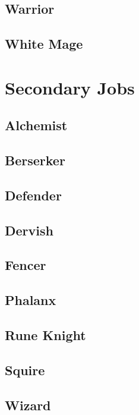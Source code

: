 \subsection{Warrior}\label{subsec:pjob-warrior}


\subsection{White Mage}\label{subsec:pjob-whitemage}


\section{Secondary Jobs}\label{sec:jobs-sjob}

\subsection{Alchemist}\label{subsec:sjob-alchemist}


\subsection{Berserker}\label{subsec:sjob-berserker}


\subsection{Defender}\label{subsec:sjob-defender}


\subsection{Dervish}\label{subsec:sjob-dervish}


\subsection{Fencer}\label{subsec:sjob-fencer}


\subsection{Phalanx}\label{subsec:sjob-phalanx}


\subsection{Rune Knight}\label{subsec:sjob-runeknight}


\subsection{Squire}\label{subsec:sjob-squire}


\subsection{Wizard}\label{subsec:sjob-wizard}

